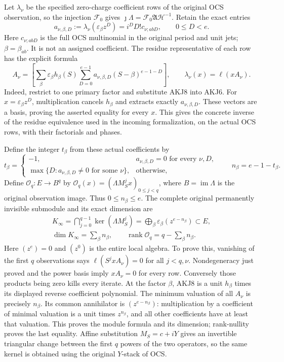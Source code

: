 \documentclass[11pt,a4paper]{article}
\begin{document}
Let $\lambda_\nu$ be the specified zero-charge coefficient rows of
the original OCS observation, so the injection $\mathcal F_0$ gives
$\jmath\Lambda=\mathcal F_0\mathfrak A\mathcal H^{-1}$.
Retain the exact entries
\[
 a_{\nu,\beta,D}:=\lambda_\nu(\varepsilon_\beta z^D)
       =i^DD!c_{\nu;abD},\qquad 0\le D<e.
 \tag{AKJ7}
\]
Here $c_{\nu;abD}$ is the full OCS multinomial in the original period
and unit jets; $\beta=\beta_{ab}$. It is not an assigned coefficient.
The residue representative of each row has the explicit formula
\[
 A_\nu=\left[\sum_\beta\varepsilon_\beta h_\beta(S)
           \sum_{D=0}^{e-1}a_{\nu,\beta,D}(S-\beta)^{e-1-D}\right],
 \qquad \lambda_\nu(x)=\ell(xA_\nu).
 \tag{AKJ8}
\]
Indeed, restrict to one primary factor and substitute AKJ8 into AKJ6.
For $x=\varepsilon_\beta z^D$, multiplication cancels $h_\beta$ and
extracts exactly $a_{\nu,\beta,D}$. These vectors are a basis, proving
the asserted equality for every $x$. This gives the concrete inverse
of the residue equivalence used in the incoming formalization, on
the actual OCS rows, with their factorials and phases.

Define the integer $t_\beta$ from these actual coefficients by
\[
 t_\beta=\begin{cases}
 -1,&a_{\nu,\beta,D}=0\text{ for every }\nu,D,\\
 \max\{D:a_{\nu,\beta,D}\ne0\text{ for some }\nu\},&\text{otherwise},
 \end{cases}\qquad n_\beta=e-1-t_\beta.
 \tag{AKJ9}
\]
Define $\mathcal O_q:E\longrightarrow B^q$ by
$\mathcal O_q(x)=(\Lambda M_S^jx)_{0\le j<q}$, where $B=\operatorname{im}\Lambda$
is the original observation image. Thus $0\le n_\beta\le e$.
The complete original permanently invisible
submodule and its exact dimension are
\[
 \begin{gathered}
 K_\infty=\bigcap_{j=0}^{q-1}\ker(\Lambda M_S^j)
 =\bigoplus_\beta
   \varepsilon_\beta(z^{e-n_\beta})\subset E,\\
 \dim K_\infty=\sum_\beta n_\beta,
 \qquad \operatorname{rank}\mathcal O_q=q-\sum_\beta n_\beta.
 \end{gathered}\tag{AKJ10}
\]
Here $(z^e)=0$ and $(z^0)$ is the entire local algebra. To prove this,
vanishing of the first $q$ observations says
$\ell(S^jxA_\nu)=0$ for all $j<q,\nu$. Nondegeneracy just proved and
the power basis imply $xA_\nu=0$ for every row. Conversely those
products being zero kills every iterate. At the factor $\beta$,
AKJ8 is a unit $h_\beta$ times its displayed reverse coefficient
polynomial. The minimum valuation of all $A_\nu$ is precisely
$n_\beta$. Its common annihilator is $(z^{e-n_\beta})$: multiplication
by a coefficient of minimal valuation is a unit times $z^{n_\beta}$,
and all other coefficients have at least that valuation. This proves
the module formula and its dimension; rank-nullity proves the last
equality. Affine substitution $M_S=c+iY$ gives an invertible triangular
change between the first $q$ powers of the two operators, so the same
kernel is obtained using the original $Y$-stack of OCS.
\end{document}
